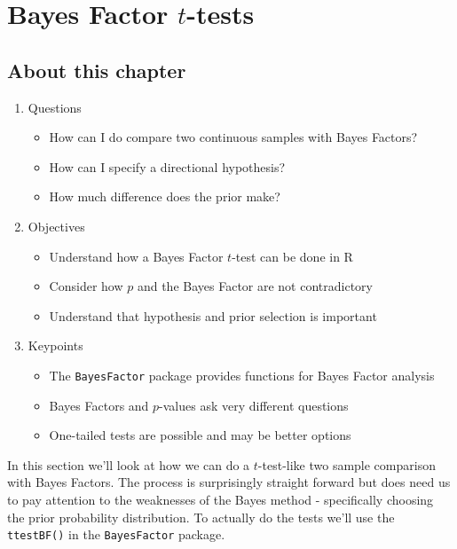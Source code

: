 \documentclass[
]{book}
\providecommand{\tightlist}{%
  \setlength{\itemsep}{0pt}\setlength{\parskip}{0pt}}
\begin{document}
\hypertarget{bayes-factor-t-tests}{%
\chapter{\texorpdfstring{Bayes Factor \(t\)-tests}{Bayes Factor t-tests}}\label{bayes-factor-t-tests}}

\hypertarget{about-this-chapter-2}{%
\section{About this chapter}\label{about-this-chapter-2}}

\begin{enumerate}
\def\labelenumi{\arabic{enumi}.}
\tightlist
\item
  Questions

  \begin{itemize}
  \tightlist
  \item
    How can I do compare two continuous samples with Bayes Factors?
  \item
    How can I specify a directional hypothesis?
  \item
    How much difference does the prior make?
  \end{itemize}
\item
  Objectives

  \begin{itemize}
  \tightlist
  \item
    Understand how a Bayes Factor \(t\)-test can be done in R
  \item
    Consider how \(p\) and the Bayes Factor are not contradictory
  \item
    Understand that hypothesis and prior selection is important
  \end{itemize}
\item
  Keypoints

  \begin{itemize}
  \tightlist
  \item
    The \texttt{BayesFactor} package provides functions for Bayes Factor analysis
  \item
    Bayes Factors and \(p\)-values ask very different questions
  \item
    One-tailed tests are possible and may be better options
  \end{itemize}
\end{enumerate}

In this section we'll look at how we can do a \(t\)-test-like two sample comparison with Bayes Factors. The process is surprisingly straight forward but does need us to pay attention to the weaknesses of the Bayes method - specifically choosing the prior probability distribution. To actually do the tests we'll use the \texttt{ttestBF()} in the \texttt{BayesFactor} package.
\end{document}
